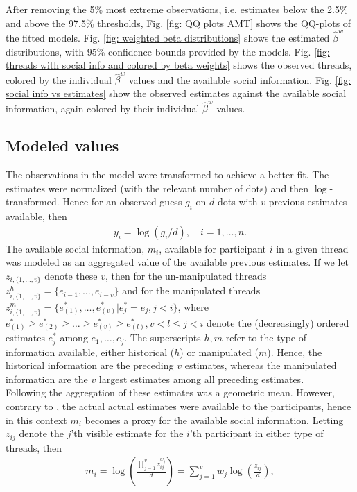\documentclass[9pt,a4paper,twocolumn,lineno]{article}
\begin{document}
After removing the 5\% most extreme observations, i.e. estimates below the 2.5\% and above the 97.5\% thresholds, Fig. \ref{fig: QQ plots AMT} shows the QQ-plots of the fitted models. Fig. \ref{fig: weighted beta distributions} shows the estimated $\hat{\beta}^w$ distributions, with 95\% confidence bounds provided by the models. Fig. \ref{fig: threads with social info and colored by beta weights} shows the observed threads, colored by the individual $\hat{\beta}^w$ values and the available social information. Fig. \ref{fig: social info vs estimates} show the observed estimates against the available social information, again colored by their individual $\hat{\beta}^w$ values.

\subsection*{Modeled values}
The observations in the model were transformed to achieve a better fit. The estimates were normalized (with the relevant number of dots) and then $\log$-transformed. Hence for an observed guess $g_i$ on $d$ dots with $v$ previous estimates available, then 
\begin{align*}
	y_i = \log(g_i/d), \quad i=1,\dots,n.
\end{align*}
The available social information, $m_i$, available for participant $i$ in a given thread was modeled as an aggregated value of the available previous estimates. If we let $z_{i,\{1,\dots,v\}}$ denote these $v$, then for the un-manipulated threads $z^h_{i, \{1,\dots,v\}} = \{e_{i-1},\dots,e_{i-v}\}$ and for the manipulated threads $z^m_{i, \{1,\dots,v\}} = \{e^*_{(1)},\dots,e^*_{(v)} | e^*_j=e_j, j<i\}$, where $e^*_{(1)}\geq e^*_{(2)}\geq\dots\geq e^*_{(v)}\geq e^*_{(l)}, v<l\leq j<i$ denote the (decreasingly) ordered estimates $e^*_j$ among $e_1,\dots,e_j$. The superscripts $h,m$ refer to the type of information available, either historical ($h$) or manipulated ($m$). Hence, the historical information are the preceding $v$ estimates, whereas the manipulated information are the $v$ largest estimates among all preceding estimates. \\
Following \citep{jayles2017social} the aggregation of these estimates was a geometric mean. However, contrary to \citep{jayles2017social}, the actual actual estimates were available to the participants, hence in this context $m_i$ becomes a proxy for the available social information. Letting $z_{ij}$ denote the $j$'th visible estimate for the $i$'th participant in either type of threads, then
\begin{align*}
	m_i = \log\left(\frac{\prod_{j=1}^v z_{ij}^{w_j}}{d}\right) %
	= \sum_{j=1}^v w_j \log\left(\frac{z_{ij}}{d}\right),
\end{align*}
\end{document}
